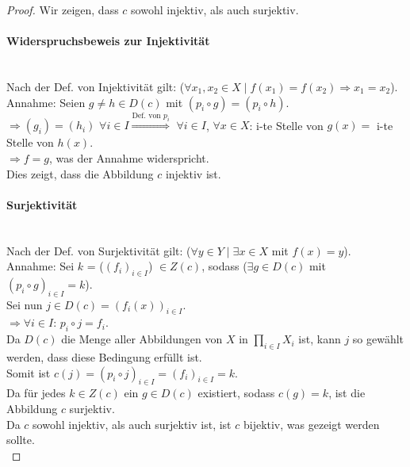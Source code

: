\documentclass[12pt, letterpaper]{article}
\begin{document}
\begin{proof} Wir zeigen, dass $c$ sowohl injektiv, als auch surjektiv.

\paragraph{Widerspruchsbeweis zur Injektivität}\hspace{50mm}\\

\noindent Nach der Def. von Injektivität gilt: ($\forall x_1, x_2 \in X \mid f(x_1) = f(x_2) \Rightarrow x_1 = x_2$).\\

\noindent Annahme: Seien $g \neq h \in D(c)$  mit $(p_i \circ g) = (p_i \circ h)$.\\

\noindent $\Rightarrow (g_i) = (h_i)$ $\forall i \in I \overset{\text{Def. von $p_i$}}{\Rightarrow}$ $\forall i \in I$, $\forall x \in X$: i-te Stelle von $g(x) =$ i-te Stelle von $h(x)$.\\

\noindent $\Rightarrow f = g$, was der Annahme widerspricht.\\

\noindent Dies zeigt, dass die Abbildung $c$ injektiv ist.

\paragraph{Surjektivität}\hspace{50mm}\\

\noindent Nach der Def. von Surjektivität gilt: ($\forall y \in Y \mid \exists x \in X$ mit $f(x) = y$).\\

\noindent Annahme: Sei $k$ = ($(f_i)_{i \in I}$) $\in Z(c)$, sodass ($\exists g \in D(c)$ mit $(p_i \circ g)_{i \in I} = k$).\\

\noindent Sei nun $j \in D(c) = (f_i(x))_{i \in I}$.\\

\noindent $\Rightarrow \forall i \in I$: $p_i \circ j = f_i$.\\

\noindent Da $D(c)$ die Menge aller Abbildungen von $X$ in $\prod_{i \in I} X_i$ ist, kann $j$ so gewählt werden, dass diese Bedingung erfüllt ist.\\

\noindent Somit ist $c(j) = (p_i \circ j)_{i \in I} = (f_i)_{i \in I} = k$.\\

\noindent Da für jedes $k \in Z(c)$ ein $g \in D(c)$ existiert, sodass $c(g) = k$, ist die Abbildung $c$ surjektiv.\\

\noindent Da $c$ sowohl injektiv, als auch surjektiv ist, ist $c$ bijektiv, was gezeigt werden sollte.\\

\end{proof}
\end{document}
